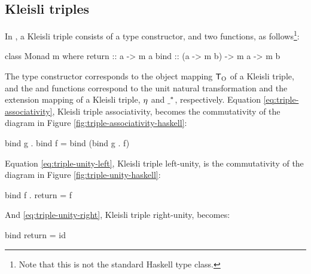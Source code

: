 \begin{example}
  \vspace{1em}
  \caseh{[]}
  \begin{steps}
    \steph{[]}
  \end{steps}
  \begin{steps}
      \eqbyih
      \eqbydefh{(++)}
  \end{steps}

\end{example}

\subsection*{Kleisli triples}

In \hask, a Kleisli triple consists of a type constructor, and two
functions, as follows\footnote{Note that this is not the standard
  Haskell  type class.}:
\begin{codehaskell}
class Monad m where
  return :: a -> m a
  bind   :: (a -> m b) -> m a -> m b
\end{codehaskell}
The type constructor  corresponds to the object mapping
$\funcO{T}$ of a Kleisli triple, and the  and
 functions correspond to the unit natural
transformation and the extension mapping of a Kleisli triple,
$\nat{\eta}$ and $\monM{T}{\underscore}$, respectively. Equation
\eqref{eq:triple-associativity}, Kleisli triple associativity, becomes
the commutativity of the diagram in Figure
\ref{fig:triple-associativity-haskell}:
\begin{codehaskell}
bind g . bind f = bind (bind g . f)
\end{codehaskell}
Equation \eqref{eq:triple-unity-left}, Kleisli triple left-unity, is
the commutativity of the diagram in Figure
\ref{fig:triple-unity-haskell}:
\begin{codehaskell}
bind f . return = f
\end{codehaskell}
And \eqref{eq:triple-unity-right}, Kleisli triple right-unity,
becomes:
\begin{codehaskell}
bind return = id
\end{codehaskell}

